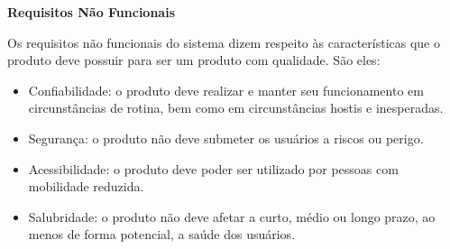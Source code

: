 \textbf{Requisitos Não Funcionais}

Os requisitos não funcionais do sistema dizem respeito às características que o produto deve possuir para ser um produto com qualidade. São eles:

\begin{itemize}
\item Confiabilidade: o produto deve realizar e manter seu funcionamento em circunstâncias de rotina, bem como em circunstâncias hostis e inesperadas.
\item Segurança: o produto não deve submeter os usuários a riscos ou perigo.
\item Acessibilidade: o produto deve poder ser utilizado por pessoas com mobilidade reduzida.
\item Salubridade: o produto não deve afetar a curto, médio ou longo prazo, ao menos de forma potencial, a saúde dos usuários. 
\end{itemize}
